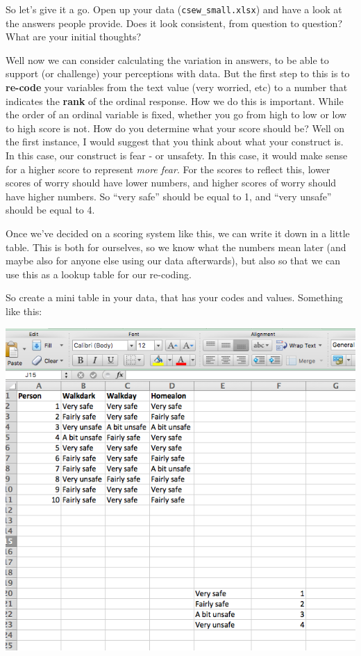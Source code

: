 \documentclass[
]{book}
\begin{document}
So let's give it a go. Open up your data (\texttt{csew\_small.xlsx}) and have a look at the answers people provide. Does it look consistent, from question to question? What are your initial thoughts?

Well now we can consider calculating the variation in answers, to be able to support (or challenge) your perceptions with data. But the first step to this is to \textbf{re-code} your variables from the text value (very worried, etc) to a number that indicates the \textbf{rank} of the ordinal response. How we do this is important. While the order of an ordinal variable is fixed, whether you go from high to low or low to high score is not. How do you determine what your score should be? Well on the first instance, I would suggest that you think about what your construct is. In this case, our construct is fear - or unsafety. In this case, it would make sense for a higher score to represent \emph{more fear}. For the scores to reflect this, lower scores of worry should have lower numbers, and higher scores of worry should have higher numbers. So ``very safe'' should be equal to 1, and ``very unsafe'' should be equal to 4.

Once we've decided on a scoring system like this, we can write it down in a little table. This is both for ourselves, so we know what the numbers mean later (and maybe also for anyone else using our data afterwards), but also so that we can use this as a lookup table for our re-coding.

So create a mini table in your data, that has your codes and values. Something like this:

\includegraphics{imgs/lookup_table.png}
\end{document}
